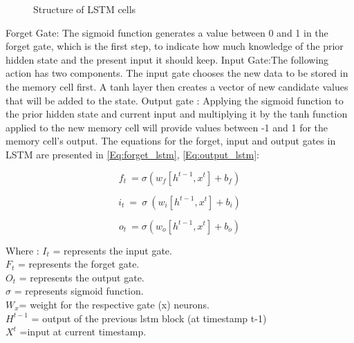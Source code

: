 \begin{figure}
{
         }
\caption{Structure of LSTM cells}
\label{fig:lstm_cell}
\end{figure}

Forget Gate: The sigmoid function generates a value between 0 and 1 in the forget gate, which is the first step, to indicate how much knowledge of the prior hidden state and the present input it should keep. Input Gate:The following action has two components. The input gate chooses the new data to be stored in the memory cell first. A tanh layer then creates a vector of new candidate values that will be added to the state. Output gate : Applying the sigmoid function to the prior hidden state and current input and multiplying it by the tanh function applied to the new memory cell will provide values between -1 and 1 for the memory cell's output. The equations for the forget, input and output gates in LSTM are presented in \ref{Eq:forget_lstm}, \ref{Eq:output_lstm}:

\begin{equation}\label{Eq:forget_lstm}
    f_t\ =\sigma (w_f[h^{t-1},x^t]+b_f)
\end{equation}

\begin{equation}\label{Eq:input_lstm}
    i_t\ =\ \sigma\ (w_i[h^{t-1},x^t]+b_i)
\end{equation}

\begin{equation}\label{Eq:output_lstm}
    o_t\ =\sigma (w_o[h^{t-1},x^t]+b_o)
\end{equation}

Where :
$I_t$ = represents the input gate.\\
$F_t$ = represents the forget gate.\\
$O_t$ = represents the output gate. \\
$\sigma$ = represents sigmoid function.\\
$W_x$= weight for the respective gate (x) neurons.\\
$H^{t-1}$ = output of the previous lstm block (at timestamp t-1)\\
$X^t$ =input at current timestamp. \\
	
